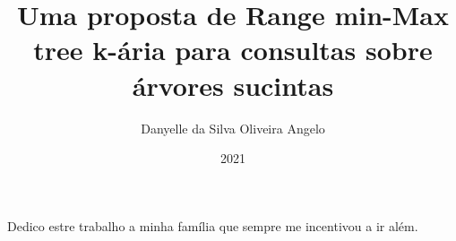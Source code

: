 \documentclass[pt,twoside,onehalfspacing,bsc]{ifbclass/ifbclass}
\title{Uma proposta de Range min-Max tree k-ária para consultas sobre árvores sucintas}
\date{2021}
\author{Danyelle da Silva Oliveira Angelo}
\begin{document}
  
  \frontmatter
  
  \frontpage
  
  \presentationpage
  
  \begin{fichacatalografica}
    \FakeFichaCatalografica %
  \end{fichacatalografica}
  
  \banca
  
  \begin{dedicatory}
    Dedico estre trabalho a minha família que sempre me incentivou a ir além.
  \end{dedicatory}
  
  \acknowledgements
  
  
  
  \resumo
  {\parindent0pt
    
  }
  
  \abstract
  {\parindent0pt
    
  }
  

  \tableofcontents
  
  \mainmatter
  
 
  
  
  
  
 
  \begin{references}
    
  \end{references}
  
 
\end{document}
